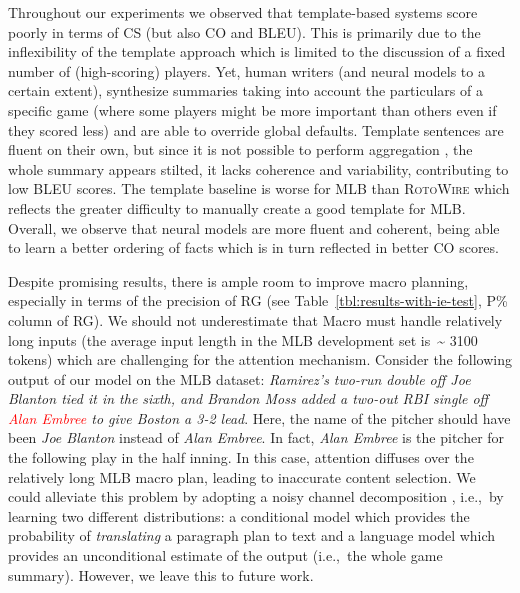 \documentclass[11pt,a4paper]{article}
\begin{document}
Throughout our experiments we observed that template-based systems
score poorly in terms of CS (but also CO and BLEU). This is primarily
due to the inflexibility of the template approach which is limited to
the discussion of a fixed number of (high-scoring) players. Yet, human
writers (and neural models to a certain extent), synthesize summaries
taking into account the particulars of a specific game (where some
players might be more important than others even if they scored less)
and are able to override global defaults.  Template sentences are
fluent on their own, but since it is not possible to perform
aggregation \cite{DBLP:journals/corr/cmp-lg-9504013}, the whole summary appears stilted,
it lacks coherence and variability, contributing to low BLEU scores.
The template baseline is worse for MLB than \textsc{RotoWire} which
reflects the greater difficulty to manually create a good template for
MLB. Overall, we observe that neural models are more fluent and coherent,
being able to learn a better ordering of facts which is in turn
reflected in better CO scores. 

Despite promising results, there is ample room to improve macro
planning, especially in terms of the precision of RG (see
Table~\ref{tbl:results-with-ie-test}, P\% column of RG). We should not
underestimate that Macro must handle relatively long inputs (the
average input length in the MLB development set is~\textasciitilde
3100 tokens) which are challenging for the attention
mechanism. Consider the following output of our model on the MLB
dataset: \textsl{Ramirez's two-run double off Joe Blanton tied it in
  the sixth, and Brandon Moss added a two-out RBI single off
  \textcolor{red}{Alan Embree} to give Boston a 3-2 lead}. Here, the
name of the pitcher should have been {\it Joe Blanton} instead of
\textsl{Alan Embree}. In fact, \textsl{Alan Embree} is the pitcher for
the following play in the half inning.
In this case, attention diffuses over the relatively long MLB macro
plan, leading to inaccurate content selection. We could alleviate
this problem by adopting a noisy channel decomposition
\cite{yee-etal-2019-simple,doi:10.1162/tacla00319}, i.e.,~by
learning two different distributions: a conditional model which
provides the probability of {\it translating} a paragraph plan to text
and a language model which provides an unconditional estimate of the
output (i.e.,~the whole game summary). However, we leave this to
future work.
\end{document}
